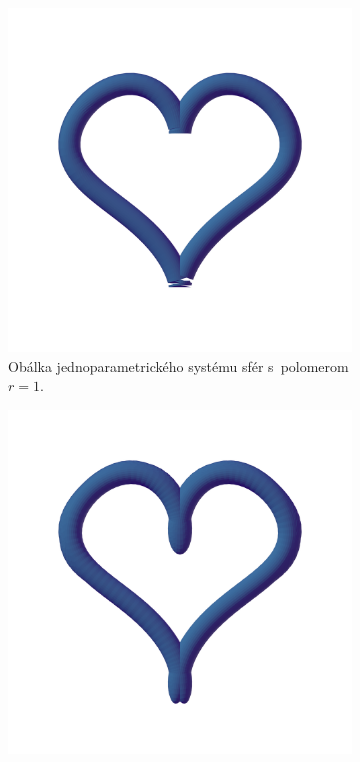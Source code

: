 \begin{figure}[h]
\begin{subfigure}[t]{0.49\textwidth}
        \includegraphics[width=\textwidth, trim=0mm 100mm 0mm 50mm, clip=true]{images/heart_envelope_spheres.png}
        	\caption{Obálka jednoparametrického systému sfér s~polomerom $r=1$.}
        \label{fig:plocha12}
    \end{subfigure}
    \hfill
    \begin{subfigure}[t]{0.49\textwidth}
        \centering
        \includegraphics[width=\textwidth, trim=0mm 100mm 0mm 50mm, clip=true]{images/heart_ellipsoids2.png}

\end{subfigure}
\end{figure}
